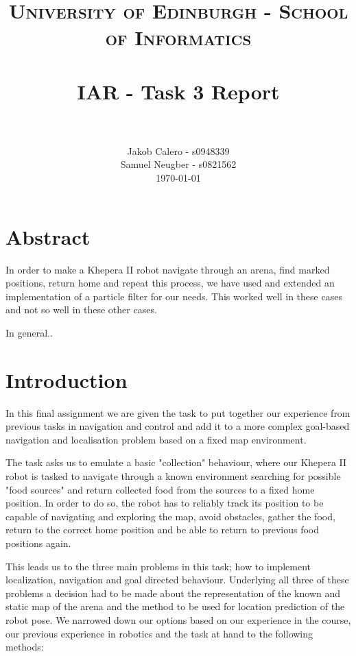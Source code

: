 \documentclass[paper=a4, fontsize=12pt]{scrartcl}	%
\title{
\vspace{-1in} 	
\usefont{OT1}{bch}{b}{n}
\normalfont \normalsize \textsc{University of Edinburgh - School of Informatics}
\\ [25pt]
\horrule{0.5pt} \\[0.4cm]
\large IAR - Task 3 Report \\
\horrule{1pt} \\[0.5cm]
}
\author{
  \normalfont \normalsize
  Jakob Calero - s0948339\\[-3pt]\normalsize
  Samuel Neugber - s0821562\\[-3pt]\normalsize
  \today
}
\date{}
\numberwithin{equation}{section}		%
\numberwithin{figure}{section}			%
\numberwithin{table}{section}				%
\begin{document}
\maketitle					%
\section{Abstract}
In order to make a Khepera II robot navigate through an arena, find marked positions, return home and repeat this process, we have used and extended an implementation of a particle filter for our needs. This worked well in these cases and not so well in these other cases.

In general..

\section{Introduction}
In this final assignment we are given the task to put together our experience from previous tasks in navigation and control and add it to a more complex goal-based navigation and localisation problem based on a fixed map environment.

The task asks us to emulate a basic "collection" behaviour, where our Khepera II robot is tasked to navigate through a known environment searching for possible "food sources" and return collected food from the sources to a fixed home position. In order to do so, the robot has to reliably track its position to be capable of navigating and exploring the map, avoid obstacles, gather the food, return to the correct home position and be able to return to previous food positions again.

This leads us to the three main problems in this task; how to implement localization, navigation and goal directed behaviour. Underlying all three of these problems a decision had to be made about the representation of the known and static map of the arena and the method to be used for location prediction of the robot pose. We narrowed down our options based on our experience in the course, our previous experience in robotics and the task at hand to the following methods:
\end{document}
